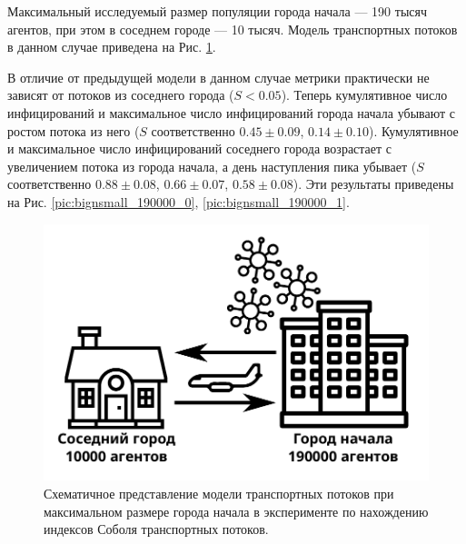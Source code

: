 \documentclass[a4paper,12pt]{article} %
\begin{document}
Максимальный исследуемый размер популяции города начала --- 190 тысяч агентов, при этом в соседнем городе --- 10 тысяч. Модель транспортных потоков в данном случае приведена на Рис. \ref{pic:bignsmall_big_start}. 

В отличие от предыдущей модели в данном случае метрики практически не зависят от потоков из соседнего города ($S < 0.05$). Теперь кумулятивное число инфицирований и максимальное число инфицирований города начала убывают с ростом потока из него ($S$ соответственно $0.45\pm 0.09$, $0.14\pm 0.10$). Кумулятивное и максимальное число инфицирований соседнего города возрастает с увеличением потока из города начала, а день наступления пика убывает ($S$ соответственно $0.88\pm 0.08$, $0.66\pm 0.07$, $0.58\pm 0.08$). Эти результаты приведены на Рис. \ref{pic:bignsmall_190000_0}, \ref{pic:bignsmall_190000_1}.

\begin{figure}[H]
    \centering
    \includegraphics[width=0.5\linewidth]{images/bignsmall_big_start.pdf}
    \caption{Схематичное представление модели транспортных потоков при максимальном размере города начала в эксперименте по нахождению индексов Соболя транспортных потоков.}
    \label{pic:bignsmall_big_start}
\end{figure}
\end{document}
